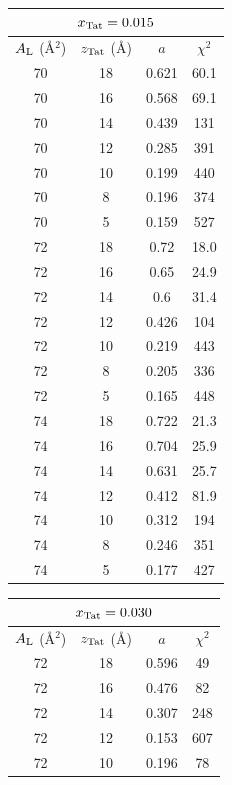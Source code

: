 \begin{table}[p]
  \centering
  \begin{tabular}{cccc}
    \multicolumn{4}{c}{$x_\textrm{Tat}=0.015$} \\
    \hline
    \rule{0pt}{14pt} %
    $A_\textrm{L}$ (\AA$^2$) & $z_\textrm{Tat}$ (\AA) & $a$ & $\chi^2$ \\
    \hline
    70 & 18 & 0.621 & 60.1 \\
    70 & 16 & 0.568 & 69.1 \\
    70 & 14 & 0.439 & 131 \\ 
    70 & 12 & 0.285 & 391 \\
    70 & 10 & 0.199 & 440 \\
    70 & 8  & 0.196 & 374 \\
    70 & 5  & 0.159	& 527 \\
    \hline
    72 & 18 & 0.72  & {\color{red}18.0} \\
    72 & 16 & 0.65  & {\color{red}24.9} \\
    72 & 14 & 0.6   & 31.4 \\
    72 & 12 & 0.426	& 104 \\
    72 & 10 & 0.219 & 443 \\
    72 & 8  & 0.205 & 336 \\
    72 & 5  & 0.165 & 448 \\
    \hline
    74 & 18 & 0.722 & {\color{red}21.3} \\
    74 & 16 & 0.704	& 25.9 \\
    74 & 14 & 0.631 & {\color{red}25.7} \\
    74 & 12 & 0.412 & 81.9 \\
    74 & 10 & 0.312 & 194 \\
    74 & 8  & 0.246 & 351 \\
    74 & 5  & 0.177 & 427 \\
    \hline
  \end{tabular}
  \qquad
  \begin{tabular}{c c c c}
    \multicolumn{4}{c}{$x_\textrm{Tat}=0.030$} \\
    \hline
    \rule{0pt}{14pt} %
    $A_\textrm{L}$ (\AA$^2$) & $z_\textrm{Tat}$ (\AA) & $a$ & $\chi^2$ \\
    \hline
    72 & 18 & 0.596 & 49  \\
    72 & 16 & 0.476 & 82  \\
    72 & 14 & 0.307 & 248 \\ 
    72 & 12 & 0.153 & 607 \\
    72 & 10 & 0.196 & 78  \\

\end{tabular}
\end{table}
